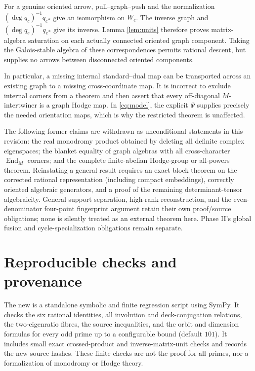 \documentclass[11pt]{article}
\theoremstyle{remark}
\newcommand{\End}{\operatorname{End}}
\begin{document}
For a genuine oriented arrow, pull--graph--push and the normalization
\((\deg q_c)^{-1}q_c{}_*\) give an isomorphism on \(W_c\).
The inverse graph and \((\deg q_e)^{-1}q_e{}_*\) give its inverse.
Lemma \ref{lem:units} therefore proves matrix-algebra saturation on
each actually connected oriented graph component.  Taking the
Galois-stable algebra of these correspondences permits rational
descent, but supplies no arrows between disconnected oriented
components.

In particular, a missing internal standard--dual map can be transported
across an existing graph to a missing cross-coordinate map.  It is
incorrect to exclude internal corners from a theorem and then assert
that every off-diagonal \(M\)-intertwiner is a graph Hodge map.
In \eqref{eq:model}, the explicit \(\Psi\) supplies precisely the
needed orientation maps, which is why the restricted theorem is
unaffected.

The following former claims are withdrawn as unconditional statements
in this revision: the real monodromy product obtained by deleting all
definite complex eigenspaces; the blanket equality of graph algebras
with all cross-character \(\End_M\) corners; and the complete
finite-abelian Hodge-group or all-powers theorem.  Reinstating a general
result requires an exact block theorem on the corrected rational
representation (including compact embeddings), correctly oriented
algebraic generators, and a proof of the remaining determinant-tensor
algebraicity.  General support separation, high-rank reconstruction,
and the even-denominator four-point fingerprint argument retain their
own proof/source obligations; none is silently treated as an external
theorem here.  Phase II's global fusion and cycle-specialization
obligations remain separate.

\appendix
\section{Reproducible checks and provenance}
The new  is a standalone symbolic and
finite regression script using SymPy.  It checks the six rational
identities, all involution and deck-conjugation relations, the
two-eigenratio fibres, the source inequalities, and the orbit and
dimension formulas for every odd prime up to a configurable bound
(default \(101\)).  It includes small exact crossed-product and
inverse-matrix-unit checks and records the new source hashes.
These finite checks are not the proof for all primes, nor a
formalization of monodromy or Hodge theory.
\end{document}
